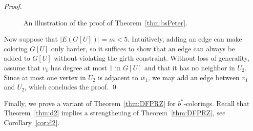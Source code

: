 \documentclass[runningheads, envcountsame]{llncs}
\begin{document}
\begin{proof}
\begin{figure}[t]
{
}
\vspace*{-10pt}
\caption{An illustration of the proof of Theorem~\ref{thm:bsPeter}.}
\label{fig:notPetersen}
\end{figure}


Now suppose that $|E(G[U])| = m < 5$.
Intuitively, adding an edge can make coloring $G[U]$ only harder, so it suffices to show that an edge can always be added to $G[U]$ without violating the girth constraint.
Without loss of generality, assume that $v_1$ has degree at most 1 in $G[U]$ and that it has no neighbor in $U_2$.
Since at most one vertex in $U_2$ is adjacent to $w_1$, we may add an edge between $v_1$ and $U_2$, which concludes the proof.
\qed\end{proof}

\setcounter{savedtheorem}{\value{theorem}}
\setcounter{theorem}{6}

Finally, we prove a variant of Theorem~\ref{thm:DFPRZ} for $b^*$-colorings.
Recall that Theorem~\ref{thm:d2} implies a strengthening of Theorem~\ref{thm:DFPRZ}, see Corollary~\ref{cor:d2}.
\end{document}
